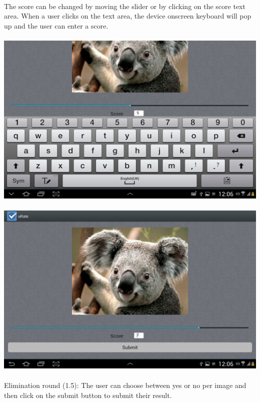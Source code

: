\documentclass[10pt,a4paper]{article}
\begin{document}
\paragraph{}
The score can be changed by moving the slider or by clicking on the score text area. When a user clicks on the text area, the device onscreen keyboard will pop up and the user can enter a score.
\paragraph{}
\advance\leftskip-1.3cm
\includegraphics[scale=0.3]{Pictures/ScoreKeyboard.png}
\paragraph{}
\includegraphics[scale=0.3]{Pictures/ScoreSlider.png}
\paragraph{}
Elimination round (1.5): 
The user can choose between yes or no per image and then click on the submit button to submit their result.
\end{document}
